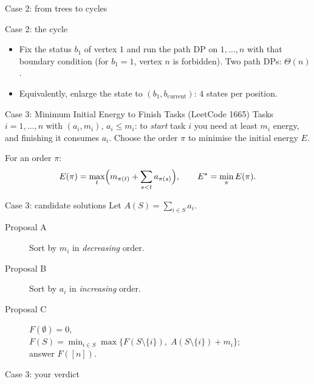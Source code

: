 \begin{frame}{Case 2: from trees to cycles}
\end{frame}

\begin{frame}{Case 2: the cycle}
	\begin{itemize}
		\item Fix the status $b_1$ of vertex $1$ and run the path DP on $1,\dots,n$ with that boundary condition
		(for $b_1=1$, vertex $n$ is forbidden). Two path DPs: $\Theta(n)$.
		\item Equivalently, enlarge the state to $(b_1,b_{\text{current}})$: $4$ states per position.
	\end{itemize}
\end{frame}

\begin{frame}{Case 3: Minimum Initial Energy to Finish Tasks (LeetCode 1665)}
	Tasks $i=1,\dots,n$ with $(a_i,m_i)$, $a_i\le m_i$: to \emph{start} task $i$ you need at least $m_i$ energy,
	and finishing it consumes $a_i$. Choose the order $\pi$ to minimise the initial energy $E$.

	\seprule

	For an order $\pi$:
	\[
		E(\pi)=\max_{t}\Bigl(m_{\pi(t)}+\sum_{s<t}a_{\pi(s)}\Bigr),\qquad
		E^\star=\min_{\pi}E(\pi).
	\]
\end{frame}

\begin{frame}{Case 3: candidate solutions}
	Let $A(S)=\sum_{i\in S}a_i$.
	\begin{description}
		\item[\alert{Proposal A}] Sort by $m_i$ in \emph{decreasing} order.
		\item[\alert{Proposal B}] Sort by $a_i$ in \emph{increasing} order.
		\item[\alert{Proposal C}] $F(\emptyset)=0$,\\
		$F(S)=\min_{i\in S}\max\bigl\{F(S\setminus\{i\}),\;A(S\setminus\{i\})+m_i\bigr\}$;\\
		answer $F([n])$.
	\end{description}
\end{frame}

\begin{frame}{Case 3: your verdict}
\end{frame}

